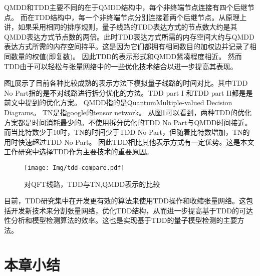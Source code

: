 QMDD和TDD主要不同的在于QMDD结构中，每个非终端节点连接有四个后继节点。
而在TDD结构中，每一个非终端节点分别连接着两个后继节点。从原理上讲，如果采用相同的排序规则，量子线路的TDD表达方式的节点数大约是其QMDD表达方式节点数的两倍。此时TDD表达方式所需的内存空间大约与QMDD表达方式所需的内存空间持平。这是因为它们都拥有相同数目的加权边并记录了相同数量的权值(即复数)。
因此TDD的表示形式和QMDD紧凑程度相近。
然而TDD由于可以轻松与张量网络中的一些优化技术结合以进一步提高其表现。

 
图\ref{fig:tdd-compare}展示了目前各种比较成熟的表示方法下模拟量子线路的时间对比。其中TDD No Part指的是不对线路进行拆分优化的方法。TDD part I 和TDD part II都是是前文中提到的优化方案。
QMDD指的是QuantumMultiple-valued Decision Diagrams。
TN是指google的tensor network\citep{roberts2019tensornetwork}。
从图\ref{fig:tdd-compare}可以看到，两种TDD的优化方案都是时间消耗最少的。不使用拆分优化的TDD No Part与QMDD时间接近。而当比特数少于10时，TN的时间少于TDD No Part，但随着比特数增加，TN的用时快速超过TDD No Part。
因此TDD相比其他表示方式有一定优势。这是本文工作研究中选择TDD作为主要技术的重要原因。

\begin{figure}[!htbp]
    \centering
    \texttt{[image: Img/tdd-compare.pdf]}
    \caption{对QFT线路，TDD与TN,QMDD表示的比较\citep{Hong_2022}}
    \label{fig:tdd-compare}
\end{figure}

目前，TDD研究集中在开发更有效的算法来使用TDD操作和收缩张量网络。这包括开发新技术来分割张量网络，优化TDD结构，从而进一步提高基于TDD的可达性分析和模型检测算法的效率。这也是实现基于TDD的量子模型检测的主要方法。

\section{本章小结}

